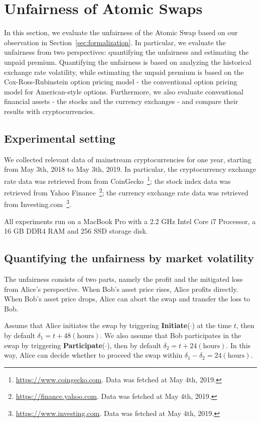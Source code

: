\section{Unfairness of Atomic Swaps}
\label{sec:evaluation}

In this section, we evaluate the unfairness of the Atomic Swap based on our observation in Section~\ref{sec:formalization}.
In particular, we evaluate the unfairness from two perspectives: quantifying the unfairness and estimating the unpaid premium.
Quantifying the unfairness is based on analyzing the historical exchange rate volatility, while estimating the unpaid premium is based on the Cox-Ross-Rubinstein option pricing model - the conventional option pricing model for American-style options.
Furthermore, we also evaluate conventional financial assets - the stocks and the currency exchanges - and compare their results with cryptocurrencies.

\subsection{Experimental setting}

We collected relevant data of mainstream cryptocurrencies for one year, starting from May 3th, 2018 to May 3th, 2019.
In particular, the cryptocurrency exchange rate data was retrieved from from CoinGecko~\footnote{\url{https://www.coingecko.com}. Data was fetched at May 4th, 2019.};
the stock index data was retrieved from Yahoo Finance~\footnote{\url{https://finance.yahoo.com}. Data was fetched at May 4th, 2019.};
the currency exchange rate data was retrieved from Investing.com~\footnote{\url{https://www.investing.com}. Data was fetched at May 4th, 2019.}.

All experiments run on a MacBook Pro with a 2.2 GHz Intel Core i7 Processor, a 16 GB DDR4 RAM and 256 SSD storage disk.

\subsection{Quantifying the unfairness by market volatility}
\label{subsec:volatility_analysis}

The unfairness consists of two parts, namely the profit and the mitigated loss from Alice's perspective.
When Bob's asset price rises, Alice profits directly.
When Bob's asset price drops, Alice can abort the swap and transfer the loss to Bob.


Assume that Alice initiates the swap by triggering \textbf{Initiate}($\cdot$) at the time $t$, then by default $\delta_1 = t + 48 (\text{hours})$.
We also assume that Bob participates in the swap by triggering \textbf{Participate}($\cdot$), then by default $\delta_2 = t + 24 (\text{hours})$.
In this way, Alice can decide whether to proceed the swap within $ \delta_1 - \delta_2 = 24 (\text{hours})$.

